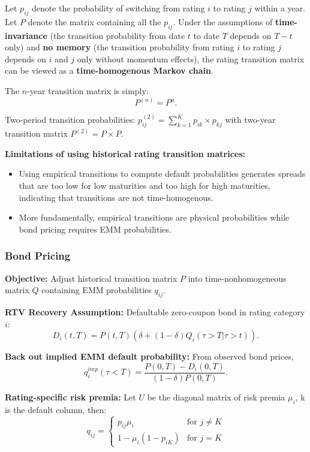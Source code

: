 \documentclass[12pt,a4paper]{article}
\begin{document}
Let $p_{ij}$ denote the probability of switching from rating $i$ to rating $j$ within a year. Let $P$ denote the matrix containing all the $p_{ij}$. Under the assumptions of \textbf{time-invariance} (the transition probability from date $t$ to date $T$ depends on $T-t$ only) and \textbf{no memory} (the transition probability from rating $i$ to rating $j$ depends on $i$ and $j$ only without momentum effects), the rating transition matrix can be viewed as a \textbf{time-homogenous Markov chain}.

The $n$-year transition matrix is simply:
$$P^{(n)} = P^n.$$

Two-period transition probabilities: $p_{ij}^{(2)} = \sum_{k=1}^K p_{ik} \times p_{kj}$ with two-year transition matrix $P^{(2)} = P \times P$.

\textbf{Limitations of using historical rating transition matrices:}
\begin{itemize}
\item Using empirical transitions to compute default probabilities generates spreads that are too low for low maturities and too high for high maturities, indicating that transitions are not time-homogenous.
\item More fundamentally, empirical transitions are physical probabilities while bond pricing requires EMM probabilities.
\end{itemize}

\subsubsection{Bond Pricing }

\textbf{Objective:} Adjust historical transition matrix $P$ into time-nonhomogeneous matrix $Q$ containing EMM probabilities $q_{ij}$.

\textbf{RTV Recovery Assumption:} Defaultable zero-coupon bond in rating category $i$:
$$D_i(t,T) = P(t,T)(\delta + (1-\delta)Q_i(\tau > T | \tau > t)).$$

\textbf{Back out implied EMM default probability:} From observed bond prices,
$$q_i^{imp}(\tau < T) = \frac{P(0,T) - D_i(0,T)}{(1-\delta)P(0,T)}.$$

\textbf{Rating-specific risk premia:} Let $U$ be the diagonal matrix of risk premia $\mu_i$, k is the default column, then:
$$q_{ij} = \begin{cases} p_{ij}\mu_i & \text{for } j \neq K \\ 1 - \mu_i(1-p_{iK}) & \text{for } j = K \end{cases}$$
\end{document}
